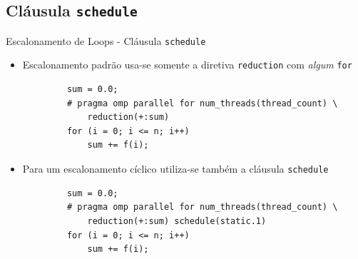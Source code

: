 	\subsection{Cláusula {\tt schedule}}
	\begin{frame}[fragile]{Escalonamento de Loops - Cláusula {\tt schedule}}
		\begin{itemize}
			\item Escalonamento padrão usa-se somente a diretiva {\tt reduction} com \textit{algum} {\tt for}
		\end{itemize}
		\begin{verbatim}
			sum = 0.0;
			# pragma omp parallel for num_threads(thread_count) \
				reduction(+:sum)		
			for (i = 0; i <= n; i++)
				sum += f(i);
		\end{verbatim}

				\pause
		\begin{itemize}
			\item Para um escalonamento cíclico utiliza-se também a cláusula {\tt schedule}
		\end{itemize}
		
		\begin{verbatim}
			sum = 0.0;
			# pragma omp parallel for num_threads(thread_count) \
				reduction(+:sum) schedule(static.1)
			for (i = 0; i <= n; i++)
				sum += f(i);
		\end{verbatim}
\end{frame}

